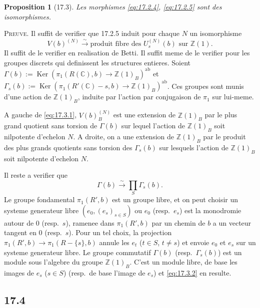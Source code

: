 \documentclass[12pt,a4paper]{article}
\theoremstyle{plain}
\newtheorem{proposition}[theorem]{Proposition}
\theoremstyle{definition}
\theoremstyle{remark}
\DeclareMathOperator{\Ker}{Ker}
\newcommand{\Betti}{B}
\newcommand{\ZZ}{\mathbb{Z}}
\newcommand{\CC}{\mathbb{C}}
\begin{document}
\begin{proposition}[17.3]\label{prop:17.3}
Les morphismes \eqref{eq:17.2.4}, \eqref{eq:17.2.5} sont des
isomorphismes.
\end{proposition}

\noindent \textsc{Preuve.} Il suffit de verifier que 17.2.5 induit
pour chaque $N$ un isomorphisme
\begin{equation}\label{eq:17.3.1}
V(b)^{(N)} \xrightarrow{\sim} \text{produit fibre des } U_s^{(N)}(b)
\text{ sur } \ZZ(1).
\end{equation}
Il suffit de le verifier en realisation de Betti. Il suffit meme de le
verifier pour les groupes discrets qui definissent les structures
entieres. Soient
$\Gamma(b) := \Ker(\pi_1(R(\CC),b) \to \ZZ(1)_\Betti)^{\mathrm{ab}}$ et
$\Gamma_s(b) := \Ker(\pi_1(R'(\CC)-s,b) \to
\ZZ(1)_\Betti)^{\mathrm{ab}}$. Ces groupes sont munis d'une action de
$\ZZ(1)_\Betti$, induite par l'action par conjugaison de $\pi_1$ sur
lui-meme.

A gauche de \eqref{eq:17.3.1}, $V(b)_\Betti^{(N)}$ est une extension
de $\ZZ(1)_\Betti$ par le plus grand quotient sans torsion de
$\Gamma(b)$ sur lequel l'action de $\ZZ(1)_\Betti$ soit nilpotente
d'echelon $N$. A droite, on a une extension de $\ZZ(1)_\Betti$ par le
produit des plus grands quotients sans torsion des $\Gamma_s(b)$ sur
lesquels l'action de $\ZZ(1)_\Betti$ soit nilpotente d'echelon $N$.

Il reste a verifier que
\begin{equation}\label{eq:17.3.2}
\Gamma(b) \xrightarrow{\sim} \prod_S \Gamma_s(b).
\end{equation}
Le groupe fondamental $\pi_1(R',b)$ est un groupe libre, et on peut
choisir un systeme generateur libre $(e_0, (e_s)_{s \in S})$ ou $e_0$
(resp.\ $e_s$) est la monodromie autour de $0$ (resp.\ $s$), ramenee
dans $\pi_1(R',b)$ par un chemin de $b$ a un vecteur tangent en $0$
(resp.\ $s$). Pour un tel choix, la projection
$\pi_1(R',b) \to \pi_1(R-\{s\},b)$ annule les $e_t$ ($t \in S$,
$t \neq s$) et envoie $e_0$ et $e_s$ sur un systeme generateur libre.
Le groupe commutatif $\Gamma(b)$ (resp.\ $\Gamma_s(b)$) est un module
sous l'algebre du groupe $\ZZ(1)_\Betti$. C'est un module libre, de
base les images de $e_s$ ($s \in S$) (resp.\ de base l'image de $e_s$)
et \eqref{eq:17.3.2} en resulte.

\subsection{17.4}
\end{document}
